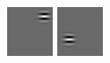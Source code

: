 \begin{figure}[ht]
 \includegraphics[width=\textwidth*11/100]{ch5/figures/firstgabor_Full_1.png}
 \includegraphics[width=\textwidth*11/100]{ch5/figures/firstgabor_Full_2.png}

\end{figure}
